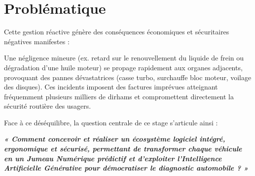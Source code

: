 \documentclass[12pt,a4paper,oneside]{report}
\begin{document}
\section*{Probl\'ematique}
Cette gestion r\'eactive g\'en\`ere des cons\'equences \'economiques et s\'ecuritaires n\'egatives manifestes :
\begin{problemBox}
Une n\'egligence mineure (ex. retard sur le renouvellement du liquide de frein ou d\'egradation d'une huile moteur) se propage rapidement aux organes adjacents, provoquant des pannes d\'evastatrices (casse turbo, surchauffe bloc moteur, voilage des disques). Ces incidents imposent des factures impr\'evues atteignant fr\'equemment plusieurs milliers de dirhams et compromettent directement la s\'ecurit\'e routi\`ere des usagers.
\end{problemBox}

Face \`a ce d\'es\'equilibre, la question centrale de ce stage s'articule ainsi :
\begin{center}
\itshape\bfseries\color{navyBlue}
« Comment concevoir et r\'ealiser un \'ecosyst\`eme logiciel int\'egr\'e, ergonomique et s\'ecuris\'e, permettant de transformer chaque v\'ehicule en un Jumeau Num\'erique pr\'edictif et d'exploiter l'Intelligence Artificielle G\'en\'erative pour d\'emocratiser le diagnostic automobile ? »
\end{center}
\end{document}
